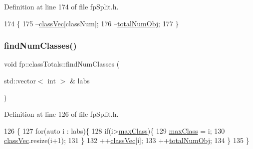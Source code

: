 Definition at line 174 of file fp\+Split.\+h.


\begin{DoxyCode}
174                                                     \{
175                 --\hyperlink{classfp_1_1classTotals_af96102537592dbda8601d0235dfccfca}{classVec}[classNum];
176                 --\hyperlink{classfp_1_1classTotals_a97be63e3e4a1b7c553df839034828aae}{totalNumObj};
177             \}
\end{DoxyCode}
\mbox{\label{classfp_1_1classTotals_a4d042d3a31d3f03d577bd4ad02bb5e6a}} 
\subsubsection{\texorpdfstring{find\+Num\+Classes()}{findNumClasses()}}
{\footnotesize\ttfamily void fp\+::class\+Totals\+::find\+Num\+Classes (\begin{DoxyParamCaption}\item[{std\+::vector$<$ int $>$ \&}]{labs }\end{DoxyParamCaption})\hspace{0.3cm}{\ttfamily [inline]}}



Definition at line 126 of file fp\+Split.\+h.


\begin{DoxyCode}
126                                                      \{
127                 \textcolor{keywordflow}{for}(\textcolor{keyword}{auto} i : labs)\{
128                     \textcolor{keywordflow}{if}(i>\hyperlink{classfp_1_1classTotals_a83aa8e17bf3b31db3ae19b9ab554624b}{maxClass})\{
129                         \hyperlink{classfp_1_1classTotals_a83aa8e17bf3b31db3ae19b9ab554624b}{maxClass} = i;
130                         \hyperlink{classfp_1_1classTotals_af96102537592dbda8601d0235dfccfca}{classVec}.resize(i+1);
131                     \}
132                     ++\hyperlink{classfp_1_1classTotals_af96102537592dbda8601d0235dfccfca}{classVec}[i];
133                     ++\hyperlink{classfp_1_1classTotals_a97be63e3e4a1b7c553df839034828aae}{totalNumObj};
134                 \}
135             \}
\end{DoxyCode}
\mbox{\label{classfp_1_1classTotals_aa05c13b36638adc361d638559c43a447}} 
